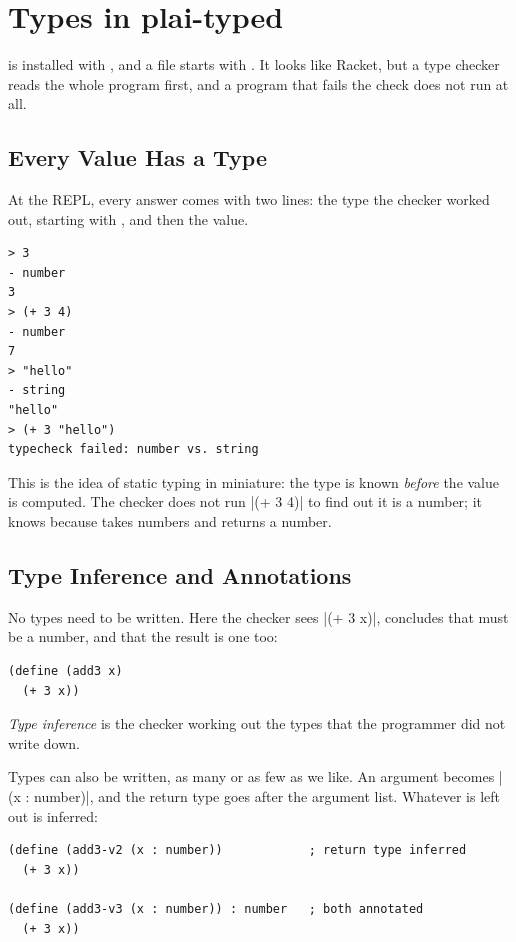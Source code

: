 \section{Types in plai-typed}
\label{sec:types}

 is installed with , and a file starts with . It looks like Racket, but a type checker reads the whole program first, and a program that fails the check does not run at all.

\subsection{Every Value Has a Type}

At the REPL, every answer comes with two lines: the type the checker worked out, starting with \code{-}, and then the value.
\begin{lstlisting}[style=repl]
> 3
- number
3
> (+ 3 4)
- number
7
> "hello"
- string
"hello"
> (+ 3 "hello")
typecheck failed: number vs. string
\end{lstlisting}
This is the idea of static typing in miniature: the type is known \emph{before} the value is computed. The checker does not run \rkt|(+ 3 4)| to find out it is a number; it knows because \code{+} takes numbers and returns a number.

\subsection{Type Inference and Annotations}

No types need to be written. Here the checker sees \rkt|(+ 3 x)|, concludes that  must be a number, and that the result is one too:
\begin{lstlisting}
(define (add3 x)
  (+ 3 x))
\end{lstlisting}

\begin{definition}
\emph{Type inference} is the checker working out the types that the programmer did not write down.
\end{definition}

Types can also be written, as many or as few as we like. An argument becomes \rkt|(x : number)|, and the return type goes after the argument list. Whatever is left out is inferred:
\begin{lstlisting}
(define (add3-v2 (x : number))            ; return type inferred
  (+ 3 x))

(define (add3-v3 (x : number)) : number   ; both annotated
  (+ 3 x))
\end{lstlisting}

